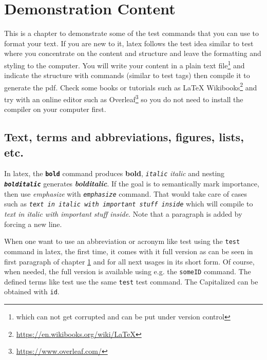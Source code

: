 \vspace{21.5pt}
\chapter{Demonstration Content}\label{demo:content}

This is a chapter to demonstrate some of the \gls{test} commands\cite{RaspberryPiPico} that you can use to format your text. If you are new to it, \gls{latex} follows the \gls{test} idea similar to \gls{test} where you concentrate on the content and structure and leave the formatting and styling to the computer. You will write your content in a plain text file\footnote{which can not get corrupted and can be put under version control} and indicate the structure with commands (similar to \gls{test} tags) then compile it to generate the pdf. Check some books or tutorials such as \LaTeX{} Wikibooks\footnote{\url{https://en.wikibooks.org/wiki/LaTeX}} and try with an online editor such as Overleaf\footnote{\url{https://www.overleaf.com/}} so you do not need to install the compiler on your computer first.

\section{Text, terms and abbreviations, figures, lists, etc.}

In \gls{latex}, the \texttt{\textbf{bold}} command produces \textbf{bold}, \texttt{\textit{italic}}  \textit{italic} and nesting \texttt{\textbf{\textit{bolditalic}}} generates \textbf{\textit{bolditalic}}. If the goal is to semantically mark importance, then use \emph{emphasize} with \texttt{\emph{emphasize}} command. That would take care of cases such as \texttt{\textit{text in italic with \emph{important stuff} inside}} which will compile to \textit{text in italic with \emph{important stuff} inside}. Note that a paragraph is added by forcing a new line.

When one want to use an abbreviation or acronym like \gls{test} using the \texttt{\gls{test}} command in \gls{latex}, the first time, it comes with it full version as can be seen in first paragraph of chapter \ref{demo:content} and for all next usages in its short form. Of course, when needed, the full version is available using e.g. the \texttt{\acrlong{someID}} command. The defined terms like \gls{test} use the same \texttt{\gls{test}} \gls{test} command. The Capitalized can be obtained with \texttt{\Gls{id}}.

